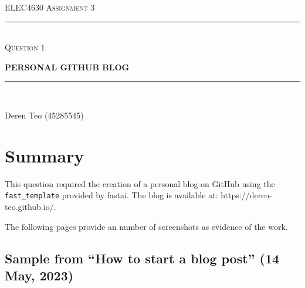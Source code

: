 \begin{titlepage}
    \centering

    \textsc{ELEC4630 Assignment 3}\\
    \vspace{9cm}

    \rule{\linewidth}{0.5pt}\\

    \vspace{1em}
    \LARGE\textsc{Question 1}\\
    \vspace{1em}

    \LARGE\uppercase{\textbf{{Personal GitHub Blog}}}\\

    \rule{\linewidth}{2pt}\\

    \vfill

    \normalsize{Deren Teo (45285545)}
    \vspace{1cm}

  \end{titlepage}

\section*{Summary}

This question required the creation of a personal blog on GitHub using the \texttt{fast\_template} provided by fastai. The blog is available at: https://deren-teo.github.io/.

The following pages provide an number of screenshots as evidence of the work.

\subsection*{Sample from ``How to start a blog post'' (14 May, 2023)}

